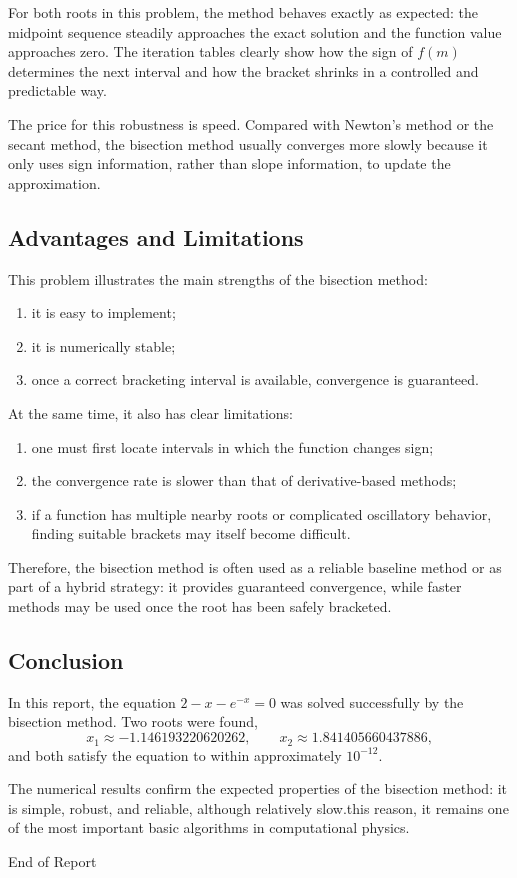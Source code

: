 \documentclass[12pt,a4paper]{article}
\begin{document}
For both roots in this problem, the method behaves exactly as expected: the midpoint sequence steadily approaches the exact solution and the function value approaches zero. The iteration tables clearly show how the sign of $f(m)$ determines the next interval and how the bracket shrinks in a controlled and predictable way.

The price for this robustness is speed. Compared with Newton's method or the secant method, the bisection method usually converges more slowly because it only uses sign information, rather than slope information, to update the approximation.

\subsection*{Advantages and Limitations}

This problem illustrates the main strengths of the bisection method:
\begin{enumerate}[label=\arabic*)]
    \item it is easy to implement;
    \item it is numerically stable;
    \item once a correct bracketing interval is available, convergence is guaranteed.
\end{enumerate}

At the same time, it also has clear limitations:
\begin{enumerate}[label=\arabic*)]
    \item one must first locate intervals in which the function changes sign;
    \item the convergence rate is slower than that of derivative-based methods;
    \item if a function has multiple nearby roots or complicated oscillatory behavior, finding suitable brackets may itself become difficult.
\end{enumerate}

Therefore, the bisection method is often used as a reliable baseline method or as part of a hybrid strategy: it provides guaranteed convergence, while faster methods may be used once the root has been safely bracketed.

\subsection*{Conclusion}

In this report, the equation $2-x-e^{-x}=0$ was solved successfully by the bisection method. Two roots were found,
\[
x_1\approx -1.146193220620262,
\qquad
x_2\approx 1.841405660437886,
\]
and both satisfy the equation to within approximately $10^{-12}$.

The numerical results confirm the expected properties of the bisection method: it is simple, robust, and reliable, although relatively slow.\n\nFor this reason, it remains one of the most important basic algorithms in computational physics.

End of Report
\end{document}
